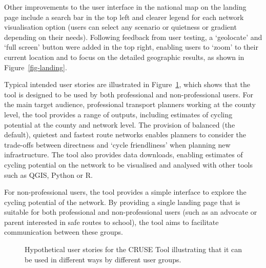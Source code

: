 \documentclass[
  super,
  preprint,
  3p]{elsarticle}
\begin{document}
Other improvements to the user interface in the national map on the
landing page include a search bar in the top left and clearer legend for
each network visualisation option (users can select any scenario or
quietness or gradient depending on their needs). Following feedback from
user testing, a `geolocate' and `full screen' button were added in the
top right, enabling users to `zoom' to their current location and to
focus on the detailed geographic results, as shown in
Figure~\ref{fig-landing}.

Typical intended user stories are illustrated in
Figure~\ref{fig-user-stories}, which shows that the tool is designed to
be used by both professional and non-professional users. For the main
target audience, professional transport planners working at the county
level, the tool provides a range of outputs, including estimates of
cycling potential at the county and network level. The provision of
balanced (the default), quietest and fastest route networks enables
planners to consider the trade-offs between directness and `cycle
friendliness' when planning new infrastructure. The tool also provides
data downloads, enabling estimates of cycling potential on the network
to be visualised and analysed with other tools such as QGIS, Python or
R.

For non-professional users, the tool provides a simple interface to
explore the cycling potential of the network. By providing a single
landing page that is suitable for both professional and non-professional
users (such as an advocate or parent interested in safe routes to
school), the tool aims to facilitate communication between these groups.

\begin{figure}


\caption{\label{fig-user-stories}Hypothetical user stories for the CRUSE
Tool illustrating that it can be used in different ways by different
user groups.}

\end{figure}%
\end{document}
